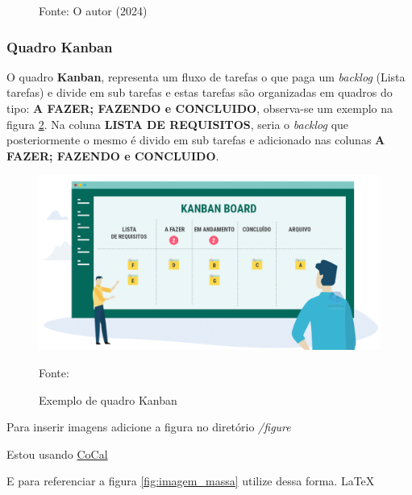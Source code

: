 \begin{figure}[H]
  \raggedright
  {\fontsize{10pt}{\baselineskip}\selectfont Fonte: O autor (2024)}
  \label{fig:ap1_cod_vigual1}
\end{figure}







\subsubsection{Quadro Kanban}
\par O quadro \textbf{Kanban}, representa um fluxo de tarefas o que paga um \textit{backlog} (Lista tarefas) e divide em sub tarefas e estas tarefas são organizadas em quadros do tipo: \textbf{A FAZER; FAZENDO e CONCLUIDO}, observa-se um exemplo na figura \ref{fig:kbn}. Na coluna \textbf{LISTA DE REQUISITOS}, seria o \textit{backlog} que posteriormente o mesmo é divido em sub tarefas e adicionado nas colunas \textbf{A FAZER; FAZENDO e CONCLUIDO}.

\begin{figure}[H] %
  \center
  \caption{Exemplo de quadro Kanban}
  \includegraphics[width=\textwidth]{figure/kbn.png}

  \raggedright
  {\fontsize{10pt}{\baselineskip}\selectfont Fonte: }
  \label{fig:kbn}
\end{figure}






Para inserir imagens adicione a figura no diretório \textit{/figure}


\par Estou usando \href {https://cocalc.com/} {CoCal}

E para referenciar a figura \ref{fig:imagem_massa} utilize dessa forma. \LaTeX

